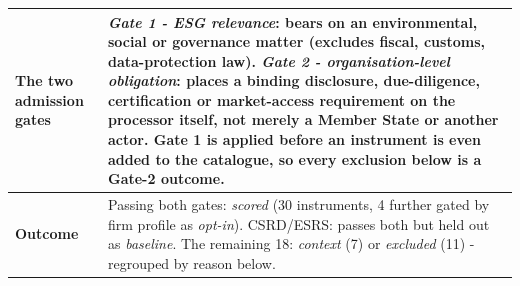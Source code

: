 \documentclass[
]{article}
\begin{document}
\begin{tabularx}{\textwidth}{@{} >{\bfseries}p{3.4cm} X @{}}
\toprule
The two admission gates & \emph{Gate 1 - ESG relevance}: bears on an environmental, social or governance matter (excludes fiscal, customs, data-protection law). \emph{Gate 2 - organisation-level obligation}: places a binding disclosure, due-diligence, certification or market-access requirement on the processor itself, not merely a Member State or another actor. Gate 1 is applied before an instrument is even added to the catalogue, so every exclusion below is a Gate-2 outcome. \\
\midrule
Outcome & Passing both gates: \emph{scored} (30 instruments, 4 further gated by firm profile as \emph{opt-in}). CSRD/ESRS: passes both but held out as \emph{baseline}. The remaining 18: \emph{context} (7) or \emph{excluded} (11) - regrouped by reason below. \\
\bottomrule
\end{tabularx}
\end{document}
